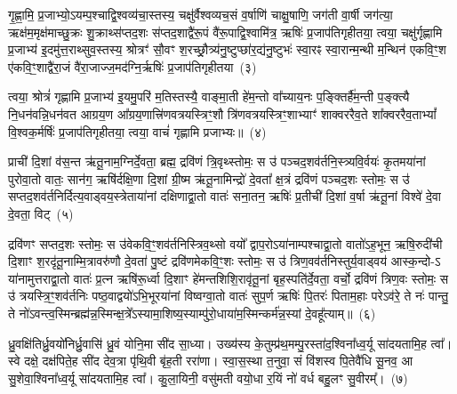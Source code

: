 गृ॒ह्णा॒मि॒ प्र॒जाभ्यो॒\-ऽयम्प॒श्चाद्वि॒श्वव्य॑चा॒स्तस्य॒ चक्षु॑र्वैश्वव्यच॒सं व॒र्\mbox{}षाणि॑ चाक्षु॒षाणि॒ जग॑ती वा॒र्\mbox{}षी जग॑त्या॒ ऋक्ष॑म॒मृक्ष॑माच्छु॒क्रः शु॒क्राथ्स॑प्तद॒शः स॑प्तद॒शाद्वै॑रू॒पं वै॑रू॒पाद्वि॒श्वामि॑त्र॒ ऋषिः॑ प्र॒जा\-प॑तिगृहीतया॒ त्वया॒ चक्षु॑र्गृह्णामि प्र॒जाभ्य॑ इ॒दमु॑त्त॒राथ्सुव॒स्तस्य॒ श्रोत्रꣳ॑ सौ॒वꣳ श॒रच्छ्रौ॒त्र्य॑नु॒ष्टुप्छा॑र॒द्य॑नु॒ष्टुभः॑ स्वा॒रꣴ स्वा॒रान्म॒न्थी म॒न्थिन॑ एकवि॒ꣳ॒श ए॑कवि॒ꣳ॒शाद्वै॑रा॒जं वै॑रा॒जाज्ज॒मद॑ग्नि॒र्\mbox{}ऋषिः॑ प्र॒जा\-प॑तिगृहीतया~(३)

त्वया॒ श्रोत्रं॑ गृह्णामि प्र॒जाभ्य॑ इ॒यमु॒परि॑ म॒तिस्तस्यै॒ वाङ्मा॒ती हे॑म॒न्तो वा᳚च्याय॒नः प॒ङ्क्तिर्\mbox{}है॑म॒न्ती प॒ङ्क्त्यै नि॒धन॑वन्नि॒धन॑वत आग्रय॒ण आ᳚ग्रय॒णात्त्रि॑णवत्रयस्त्रिꣳ॒शौ त्रि॑णवत्रयस्त्रिꣳ॒शाभ्याꣳ॑ शाक्वररैव॒ते शा᳚क्वररैव॒ता\-भ्यां᳚ वि॒श्वक॒र्मर्\mbox{}षिः॑ प्र॒जा\-प॑तिगृहीतया॒ त्वया॒ वाचं॑ गृह्णामि प्रजाभ्यः॥~(४)

{\anuvakamend[{त्वया॒ मनो॑ ज॒मद॑ग्नि॒र्\mbox{}ऋषिः॑ प्र॒जा\-प॑तिगृहीतया त्रि॒ꣳ॒शच्च॑}]}%

प्राची॑ दि॒शां व॑स॒न्त ऋ॑तू॒नाम॒ग्निर्दे॒वता॒ ब्रह्म॒ द्रवि॑णं त्रि॒वृथ्स्तोमः॒ स उ॑ पञ्चद॒शव॑र्तनि॒स्त्र्यवि॒र्वयः॑ कृ॒तमया॑नां पुरोवा॒तो वातः॒ सान॑ग॒ ऋषि॑र्दक्षि॒णा दि॒शां ग्री॒ष्म ऋ॑तू॒नामिन्द्रो॑ दे॒वता᳚ क्ष॒त्रं द्रवि॑णं पञ्चद॒शः स्तोमः॒ स उ॑ सप्तद॒शव॑र्तनिर्दित्य॒वाड्वय॒स्त्रेताया॑नां दक्षिणाद्वा॒तो वातः॑ सना॒तन॒ ऋषिः॑ प्र॒तीची॑ दि॒शां व॒र्\mbox{}षा ऋ॑तू॒नां विश्वे॑ दे॒वा दे॒वता॒ विट्~(५)

द्रवि॑णꣳ सप्तद॒शः स्तोमः॒ स उ॑वेकवि॒ꣳ॒शव॑र्तनिस्त्रिव॒थ्सो वयो᳚ द्वाप॒रो\-ऽया॑नाम्पश्चाद्वा॒तो वातो॑\-ऽह॒भून॒ ऋषि॒रुदी॑ची दि॒शाꣳ श॒रदृ॑तू॒नाम्मि॒त्रावरु॑णौ दे॒वता॑ पु॒ष्टं द्रवि॑णमेकवि॒ꣳ॒शः स्तोमः॒ स उ॑ त्रिण॒वव॑र्तनिस्तुर्य॒वाड्वय॑ आस्क॒न्दो-\-ऽ या॑नामुत्तराद्वा॒तो वातः॑ प्र॒त्न ऋषि॑रू॒र्ध्वा दि॒शाꣳ हे॑मन्तशिशि॒रावृ॑तू॒नां बृह॒स्पति॑र्दे॒वता॒ वर्चो॒ द्रवि॑णं त्रिण॒वः स्तोमः॒ स उ॑ त्रयस्त्रि॒ꣳ॒शव॑र्तनिः पष्ठ॒वाद्वयो॑\-ऽभि॒भूरया॑नां विष्वग्वा॒तो वातः॑ सुप॒र्ण ऋषिः॑ पि॒तरः॑ पिताम॒हाः परे\-ऽव॑रे॒ ते नः॑ पान्तु॒ ते नो॑\-ऽवन्त्व॒स्मिन्ब्रह्म॑न्न॒स्मिन्क्ष॒त्रे᳚\-ऽस्यामा॒शिष्य॒स्याम्पु॑रो॒धाया॑म॒स्मिन्कर्म॑न्न॒स्यां दे॒वहू᳚त्याम्॥~(६)

{\anuvakamend[{विट्प॑ष्ठ॒वाड्वयो॒\-ऽष्टाविꣳ॑शतिश्च}]}%

ध्रु॒वक्षि॑तिर्ध्रु॒वयो॑निर्ध्रु॒वासि॑ ध्रु॒वं योनि॒मा सी॑द सा॒ध्या। उख्य॑स्य के॒तुम्प्र॑थ॒मम्पु॒रस्ता॑द॒श्विना᳚ध्व॒र्यू सा॑दयतामि॒ह त्वा᳚। स्वे दक्षे॒ दक्ष॑पिते॒ह सी॑द देव॒त्रा पृ॑थि॒वी बृ॑ह॒ती ररा॑णा। स्वा॒स॒स्था त॒नुवा॒ सं वि॑शस्व पि॒तेवै॑धि सू॒नव॒ आ सु॒शेवा॒श्विना᳚ध्व॒र्यू सा॑दयतामि॒ह त्वा᳚। कु॒ला॒यिनी॒ वसु॑मती वयो॒धा र॒यिं नो॑ वर्ध बहु॒लꣳ सु॒वीरम्᳚।~(७)

